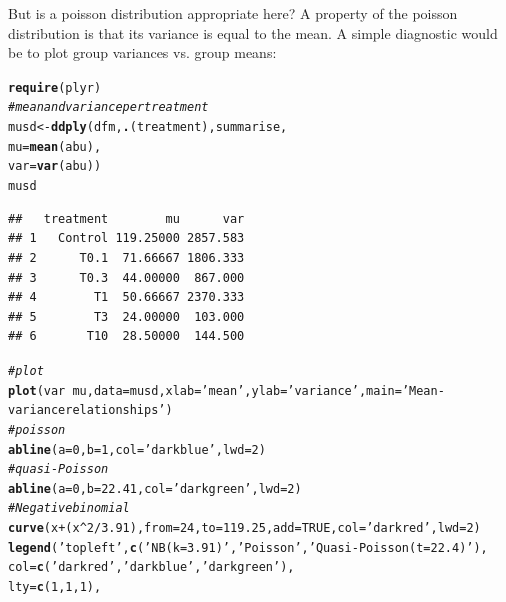 \documentclass{scrartcl}\usepackage[]{graphicx}\usepackage[]{color}
\makeatletter
\newcommand{\hlnum}[1]{\textcolor[rgb]{0.686,0.059,0.569}{#1}}%
\newcommand{\hlstr}[1]{\textcolor[rgb]{0.192,0.494,0.8}{#1}}%
\newcommand{\hlcom}[1]{\textcolor[rgb]{0.678,0.584,0.686}{\textit{#1}}}%
\newcommand{\hlopt}[1]{\textcolor[rgb]{0,0,0}{#1}}%
\newcommand{\hlstd}[1]{\textcolor[rgb]{0.345,0.345,0.345}{#1}}%
\newcommand{\hlkwb}[1]{\textcolor[rgb]{0.69,0.353,0.396}{#1}}%
\newcommand{\hlkwc}[1]{\textcolor[rgb]{0.333,0.667,0.333}{#1}}%
\newcommand{\hlkwd}[1]{\textcolor[rgb]{0.737,0.353,0.396}{\textbf{#1}}}%
\newenvironment{kframe}{%
 \def\at@end@of@kframe{}%
 \ifinner\ifhmode%
  \def\at@end@of@kframe{\end{minipage}}%
  \begin{minipage}{\columnwidth}%
 \fi\fi%
 \def\FrameCommand##1{\hskip\@totalleftmargin \hskip-\fboxsep
 \colorbox{shadecolor}{##1}\hskip-\fboxsep
     \hskip-\linewidth \hskip-\@totalleftmargin \hskip\columnwidth}%
 \MakeFramed {\advance\hsize-\width
   \@totalleftmargin\z@ \linewidth\hsize
   \@setminipage}}%
 {\par\unskip\endMakeFramed%
 \at@end@of@kframe}
\newenvironment{knitrout}{}{} %
\makeatother
\begin{document}
But is a poisson distribution appropriate here? 
A property of the poisson distribution is that its variance is equal to the mean. 
A simple diagnostic would be to plot group variances vs. group means:

\begin{knitrout}
\color{fgcolor}\begin{kframe}
\begin{alltt}
\hlkwd{require}\hlstd{(plyr)}
\hlcom{# mean and variance per treatment}
\hlstd{musd} \hlkwb{<-} \hlkwd{ddply}\hlstd{(dfm,} \hlkwd{.}\hlstd{(treatment), summarise,}
              \hlkwc{mu} \hlstd{=} \hlkwd{mean}\hlstd{(abu),}
              \hlkwc{var} \hlstd{=} \hlkwd{var}\hlstd{(abu))}
\hlstd{musd}
\end{alltt}
\begin{verbatim}
##   treatment        mu      var
## 1   Control 119.25000 2857.583
## 2      T0.1  71.66667 1806.333
## 3      T0.3  44.00000  867.000
## 4        T1  50.66667 2370.333
## 5        T3  24.00000  103.000
## 6       T10  28.50000  144.500
\end{verbatim}
\begin{alltt}
\hlcom{# plot}
\hlkwd{plot}\hlstd{(var} \hlopt{~} \hlstd{mu,} \hlkwc{data} \hlstd{= musd,} \hlkwc{xlab} \hlstd{=} \hlstr{'mean'}\hlstd{,} \hlkwc{ylab} \hlstd{=} \hlstr{'variance'}\hlstd{,} \hlkwc{main} \hlstd{=} \hlstr{'Mean-variance relationships'}\hlstd{)}
\hlcom{# poisson}
\hlkwd{abline}\hlstd{(}\hlkwc{a} \hlstd{=} \hlnum{0}\hlstd{,} \hlkwc{b} \hlstd{=} \hlnum{1}\hlstd{,} \hlkwc{col} \hlstd{=} \hlstr{'darkblue'}\hlstd{,} \hlkwc{lwd} \hlstd{=} \hlnum{2}\hlstd{)}
\hlcom{# quasi-Poisson}
\hlkwd{abline}\hlstd{(}\hlkwc{a} \hlstd{=} \hlnum{0}\hlstd{,} \hlkwc{b} \hlstd{=} \hlnum{22.41}\hlstd{,} \hlkwc{col} \hlstd{=} \hlstr{'darkgreen'}\hlstd{,} \hlkwc{lwd} \hlstd{=} \hlnum{2}\hlstd{)}
\hlcom{# Negative binomial}
\hlkwd{curve}\hlstd{(x} \hlopt{+} \hlstd{(x}\hlopt{^}\hlnum{2} \hlopt{/} \hlnum{3.91}\hlstd{),} \hlkwc{from} \hlstd{=} \hlnum{24}\hlstd{,} \hlkwc{to} \hlstd{=} \hlnum{119.25}\hlstd{,} \hlkwc{add} \hlstd{=} \hlnum{TRUE}\hlstd{,} \hlkwc{col} \hlstd{=} \hlstr{'darkred'}\hlstd{,} \hlkwc{lwd} \hlstd{=} \hlnum{2}\hlstd{)}
\hlkwd{legend}\hlstd{(}\hlstr{'topleft'}\hlstd{,} \hlkwd{c}\hlstd{(}\hlstr{'NB(k = 3.91)'}\hlstd{,} \hlstr{'Poisson'}\hlstd{,} \hlstr{'Quasi-Poisson(t = 22.4)'}\hlstd{),}
       \hlkwc{col} \hlstd{=} \hlkwd{c}\hlstd{(}\hlstr{'darkred'}\hlstd{,} \hlstr{'darkblue'}\hlstd{,} \hlstr{'darkgreen'}\hlstd{),}
       \hlkwc{lty} \hlstd{=} \hlkwd{c}\hlstd{(}\hlnum{1}\hlstd{,}\hlnum{1}\hlstd{,} \hlnum{1}\hlstd{),}

\end{alltt}
\end{kframe}
\end{knitrout}
\end{document}
